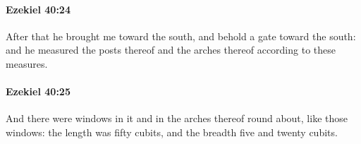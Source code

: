 		\paragraph{Ezekiel 40:24} %
			\label{EZEKIEL-40-24}

			After that he brought me toward the south, and behold a gate toward the south: and he measured the posts thereof and the arches thereof according to these measures.


		\paragraph{Ezekiel 40:25} %
			\label{EZEKIEL-40-25}

			And there were windows in it and in the arches thereof round about, like those windows: the length was fifty cubits, and the breadth five and twenty cubits.


